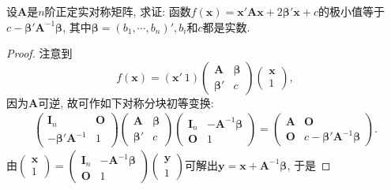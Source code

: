 \documentclass[../../main.tex]{subfiles}%
\begin{document}
\begin{example}
设$\boldsymbol{A}$是$n$阶正定实对称矩阵, 求证: 函数$f(\boldsymbol{x})=\boldsymbol{x}'\boldsymbol{A}\boldsymbol{x}+2\boldsymbol{\beta}'\boldsymbol{x}+c$的极小值等于$c - \boldsymbol{\beta}'\boldsymbol{A}^{-1}\boldsymbol{\beta}$, 其中$\boldsymbol{\beta}=(b_1, \cdots, b_n)', b_i$和$c$都是实数.
\end{example}
\begin{proof}

注意到
\[
f(\boldsymbol{x})=(\boldsymbol{x}'\ 1)\begin{pmatrix}
\boldsymbol{A} & \boldsymbol{\beta} \\
\boldsymbol{\beta}' & c
\end{pmatrix}\begin{pmatrix}
\boldsymbol{x} \\
1
\end{pmatrix},
\]
因为$\boldsymbol{A}$可逆, 故可作如下对称分块初等变换:
\begin{align*}
\begin{pmatrix}
\boldsymbol{I}_n & \boldsymbol{O} \\
-\boldsymbol{\beta}'\boldsymbol{A}^{-1} & 1
\end{pmatrix}
\begin{pmatrix}
\boldsymbol{A} & \boldsymbol{\beta} \\
\boldsymbol{\beta}' & c
\end{pmatrix}
\begin{pmatrix}
\boldsymbol{I}_n & -\boldsymbol{A}^{-1}\boldsymbol{\beta} \\
\boldsymbol{O} & 1
\end{pmatrix}
=
\begin{pmatrix}
\boldsymbol{A} & \boldsymbol{O} \\
\boldsymbol{O} & c - \boldsymbol{\beta}'\boldsymbol{A}^{-1}\boldsymbol{\beta}
\end{pmatrix}.
\end{align*}
由$\begin{pmatrix}
\boldsymbol{x} \\
1
\end{pmatrix}=\begin{pmatrix}
\boldsymbol{I}_n & -\boldsymbol{A}^{-1}\boldsymbol{\beta} \\
\boldsymbol{O} & 1
\end{pmatrix}\begin{pmatrix}
\boldsymbol{y} \\
1
\end{pmatrix}$可解出$\boldsymbol{y}=\boldsymbol{x}+\boldsymbol{A}^{-1}\boldsymbol{\beta}$, 于是

\end{proof}
\end{document}
